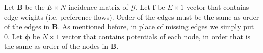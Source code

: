 \documentclass[lmodern, utf8, diplomski]{fer}
\newcommand{\matr}[1]{\mathbold{#1}}
\newcommand{\graph}[1]{\mathcal{#1}}
\begin{document}
  Let $\matr{B}$ be the $E \times N$ incidence matrix of $\graph{G}$.
  Let $\matr{f}$ be $E \times 1$ vector that contains edge weights (i.e. preference flows).
  Order of the edges must be the same as order of the edges in $\matr{B}$.
  As mentioned before, in place of missing edges we simply put 0.
  Let $\matr{\phi}$ be $N \times 1$ vector that contains potentials of each node, in order that is the same as order of the nodes in $\matr{B}$.
  
\end{document}
